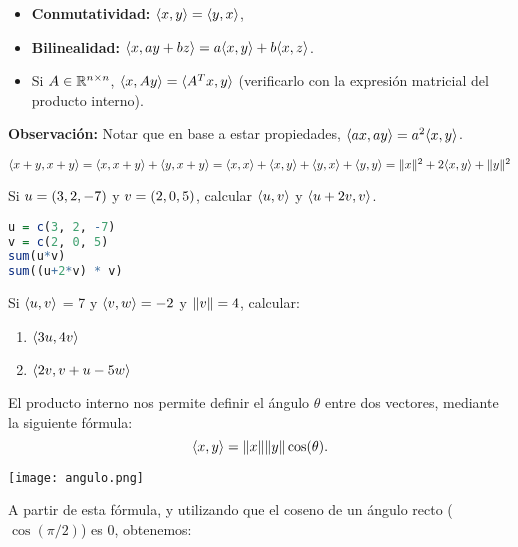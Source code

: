 \begin{itemize}
\item   \textbf{Conmutatividad:} $\langle \xb, \yb \rangle= \langle \yb, \xb \rangle$,
\item   \textbf{Bilinealidad:} $\langle \xb, a\yb + b\zb \rangle = a \langle \xb, \yb \rangle + b \langle \xb, \zb \rangle$.
\item   Si $\Ab \in \R^{n \times n}$, $\langle \xb, \Ab\yb \rangle = \langle \Ab^T \xb, \yb \rangle$ (verificarlo con la expresión matricial del producto interno).
\end{itemize}

\textbf{Observación:} Notar que en base a estar propiedades, $\langle a\xb, a\yb \rangle = a^2 \langle \xb, \yb \rangle$.

\begin{ejemplo}
$\langle \xb + \yb, \xb + \yb\rangle = \langle \xb, \xb + \yb\rangle + \langle \yb, \xb + \yb\rangle = \langle \xb, \xb \rangle + \langle \xb, \yb \rangle + \langle \yb, \xb \rangle + \langle \yb, \yb\rangle = \|\xb\|^2 + 2\langle \xb, \yb \rangle + \|\yb\|^2$
\end{ejemplo}

\begin{ejercicio}

Si $\ub = (3, 2, -7)$ y $\vb = (2, 0, 5)$, calcular $\langle \ub, \vb\rangle$ y $\langle \ub + 2\vb, \vb\rangle$.

\begin{lstlisting}[language=R]
u = c(3, 2, -7)
v = c(2, 0, 5)
sum(u*v)
sum((u+2*v) * v)
\end{lstlisting}

Si $\langle \ub, \vb \rangle$ = 7 y $\langle \vb, \wb\rangle = -2$ y $\|\vb\| = 4$, calcular:
\begin{enumerate}
\item $\langle 3\ub, 4\vb\rangle$
\item $\langle 2\vb, \vb + \ub - 5\wb\rangle$
\end{enumerate}
\end{ejercicio}

\begin{aplicacion}
El producto interno nos permite definir el ángulo $\theta$ entre dos vectores, mediante la siguiente fórmula:
$$
\langle \xb, \yb \rangle = \|\xb\| \|\yb\| \cos(\theta).
$$

\texttt{[image: angulo.png]}
\end{aplicacion}

A partir de esta fórmula, y utilizando que el coseno de un ángulo recto ($\cos(\pi/2)$) es 0, obtenemos:

